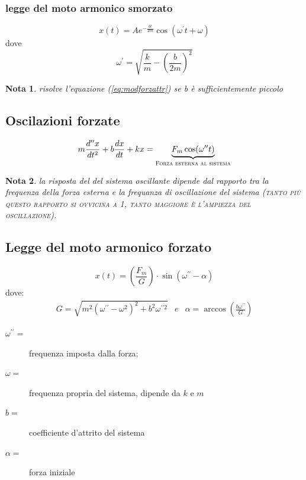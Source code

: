\documentclass{book}
\newtheorem{nota}{Nota}[section]
\begin{document}
\subsubsection{legge del moto armonico smorzato}
\label{sec:leggdelmotarmsmorz}

\begin{equation}
  \label{eq:leggdelmotarmsmorz}
  x(t)=Ae^{-\frac{bt}{2m}}\cos(\omega^\prime t+\omega)
\end{equation}
dove
\begin{equation*}
  \omega^\prime = \sqrt{\frac{k}{m} - \left(\frac{b}{2m}\right)^2}
\end{equation*}
\begin{nota}
  risolve l'equazione (\ref{eq:modforzattr}) se b è sufficientemente piccolo
\end{nota}

\subsection{Oscilazioni forzate}
\label{sec:oscillaforz}
\begin{equation}
  \label{eq:oscillaforz}
  m\frac{d^{\prime\prime}x}{dt^2}+b\frac{dx}{dt}+kx=\underbrace{F_m\cos(\omega^{\prime\prime}t)}_{\textsc{Forza esterna al sistema}}
\end{equation}
\begin{nota}
  la risposta del del sistema oscillante dipende dal rapporto tra la frequenza della forza esterna e la frequanza di oscillazione del sistema (\textsc{tanto più questo rapporto si ovvicina a 1, tanto maggiore è l'ampiezza del oscillazione}).
\end{nota}

\subsection{Legge del moto armonico forzato}
\label{sec:leggedelmotoarmforz}

\begin{equation}
  \label{eq:leggedelmotoarmforz}
  x(t)=\left(\frac{F_m}{G}\right)\cdot \sin(\omega^{\prime\prime}-\alpha)
\end{equation}
dove:
\begin{eqnarray}
  \label{eq:leggedelmotoarmforz2}
  G=\sqrt{m^2(\omega^{\prime\prime}-\omega^2)^2+b^2\omega^{\prime\prime2}} &e& \alpha=\arccos\left(\frac{b\omega^{\prime\prime}}{G}\right)
\end{eqnarray}
\begin{description}
\item[$\omega^{\prime\prime}=$] frequenza imposta dalla forza;
\item[$\omega=$] frequenza propria del sistema, dipende da $k$ e $m$
\item[$b=$] coefficiente d'attrito del sistema
\item[$\alpha=$] forza iniziale
\end{description}
\end{document}
